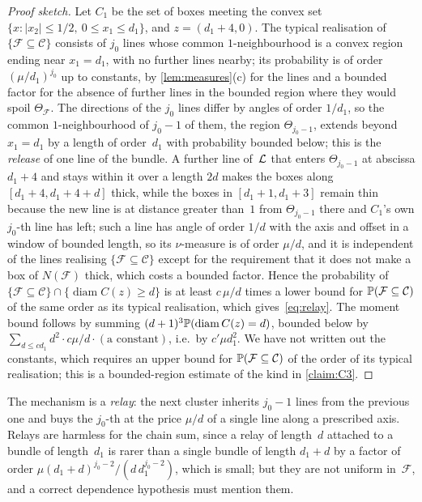 \documentclass[11pt,letterpaper]{article}
\DeclareMathOperator{\diam}{diam}
\begin{document}
\begin{proof}[Proof sketch]
Let $C_1$ be the set of boxes meeting the convex set $\{x\colon\lvert x_2\rvert\le1/2,\ 0\le x_1\le d_1\}$, and $z=(d_1+4,0)$. The typical realisation of $\{\mathcal F\subseteq\mathcal C\}$ consists of $j_0$ lines whose common $1$-neighbourhood is a convex region ending near $x_1=d_1$, with no further lines nearby; its probability is of order $(\mu/d_1)^{j_0}$ up to constants, by \cref{lem:measures}(c) for the lines and a bounded factor for the absence of further lines in the bounded region where they would spoil $\Theta_{\mathcal F}$. The directions of the $j_0$ lines differ by angles of order $1/d_1$, so the common $1$-neighbourhood of $j_0-1$ of them, the region $\Theta_{j_0-1}$, extends beyond $x_1=d_1$ by a length of order~$d_1$ with probability bounded below; this is the \emph{release} of one line of the bundle. A further line of~$\cL$ that enters $\Theta_{j_0-1}$ at abscissa $d_1+4$ and stays within it over a length $2d$ makes the boxes along $[d_1+4,d_1+4+d]$ thick, while the boxes in $[d_1+1,d_1+3]$ remain thin because the new line is at distance greater than~$1$ from $\Theta_{j_0-1}$ there and $C_1$'s own $j_0$-th line has left; such a line has angle of order $1/d$ with the axis and offset in a window of bounded length, so its $\nu$-measure is of order $\mu/d$, and it is independent of the lines realising $\{\mathcal F\subseteq\mathcal C\}$ except for the requirement that it does not make a box of $N(\mathcal F)$ thick, which costs a bounded factor. Hence the probability of $\{\mathcal F\subseteq\mathcal C\}\cap\{\diam C(z)\ge d\}$ is at least $c\,\mu/d$ times a lower bound for $\P(\mathcal F\subseteq\mathcal C)$ of the same order as its typical realisation, which gives~\eqref{eq:relay}. The moment bound follows by summing $(d+1)^3\P(\diam C(z)=d)$, bounded below by $\sum_{d\le cd_1}d^2\cdot c\mu/d\cdot(\text{a constant})$, i.e.\ by $c'\mu d_1^2$. We have not written out the constants, which requires an upper bound for $\P(\mathcal F\subseteq\mathcal C)$ of the order of its typical realisation; this is a bounded-region estimate of the kind in \cref{claim:C3}.
\end{proof}

The mechanism is a \emph{relay}: the next cluster inherits $j_0-1$ lines from the previous one and buys the $j_0$-th at the price $\mu/d$ of a single line along a prescribed axis. Relays are harmless for the chain sum, since a relay of length~$d$ attached to a bundle of length~$d_1$ is rarer than a single bundle of length $d_1+d$ by a factor of order $\mu(d_1+d)^{j_0-2}/(d\,d_1^{j_0-2})$, which is small; but they are not uniform in~$\mathcal F$, and a correct dependence hypothesis must mention them.
\end{document}
